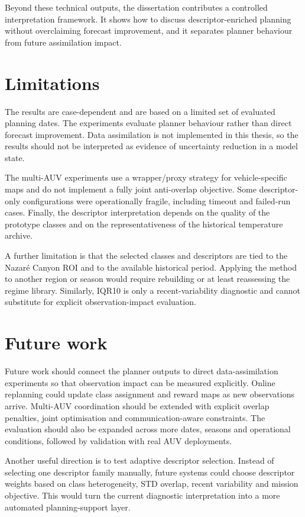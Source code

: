 Beyond these technical outputs, the dissertation contributes a controlled interpretation framework. It shows how to discuss descriptor-enriched planning without overclaiming forecast improvement, and it separates planner behaviour from future assimilation impact.

\section{Limitations}

The results are case-dependent and are based on a limited set of evaluated planning dates. The experiments evaluate planner behaviour rather than direct forecast improvement. Data assimilation is not implemented in this thesis, so the results should not be interpreted as evidence of uncertainty reduction in a model state.

The multi-AUV experiments use a wrapper/proxy strategy for vehicle-specific maps and do not implement a fully joint anti-overlap objective. Some descriptor-only configurations were operationally fragile, including timeout and failed-run cases. Finally, the descriptor interpretation depends on the quality of the prototype classes and on the representativeness of the historical temperature archive.

A further limitation is that the selected classes and descriptors are tied to the Nazar\'e Canyon ROI and to the available historical period. Applying the method to another region or season would require rebuilding or at least reassessing the regime library. Similarly, IQR10 is only a recent-variability diagnostic and cannot substitute for explicit observation-impact evaluation.

\section{Future work}

Future work should connect the planner outputs to direct data-assimilation experiments so that observation impact can be measured explicitly. Online replanning could update class assignment and reward maps as new observations arrive. Multi-AUV coordination should be extended with explicit overlap penalties, joint optimisation and communication-aware constraints. The evaluation should also be expanded across more dates, seasons and operational conditions, followed by validation with real AUV deployments.

Another useful direction is to test adaptive descriptor selection. Instead of selecting one descriptor family manually, future systems could choose descriptor weights based on class heterogeneity, STD overlap, recent variability and mission objective. This would turn the current diagnostic interpretation into a more automated planning-support layer.

